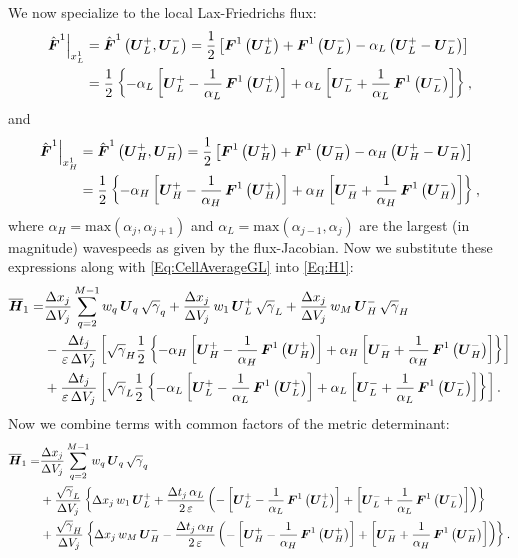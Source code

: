  We now specialize to the local Lax-Friedrichs flux:
\begin{align}
    \hat{\boldsymbol{F}}^{1}\Big|_{x^{1}_{L}}&=\hat{\boldsymbol{F}}^{1}\left(\boldsymbol{U}^{+}_{L},\boldsymbol{U}^{-}_{L}\right)=\frac{1}{2}\left[\boldsymbol{F}^{1}\left(\boldsymbol{U}^{+}_{L}\right)+\boldsymbol{F}^{1}\left(\boldsymbol{U}^{-}_{L}\right)-\alpha_{L}\left(\boldsymbol{U}_{L}^{+}-\boldsymbol{U}_{L}^{-}\right)\right]\\
    &=\frac{1}{2}\left\{-\alpha_{L}\left[\boldsymbol{U}^{+}_{L}-\frac{1}{\alpha_{L}}\,\boldsymbol{F}^{1}\left(\boldsymbol{U}^{+}_{L}\right)\right]+\alpha_{L}\left[\boldsymbol{U}^{-}_{L}+\frac{1}{\alpha_{L}}\,\boldsymbol{F}^{1}\left(\boldsymbol{U}^{-}_{L}\right)\right]\right\},
\end{align}
and
\begin{align}
    \hat{\boldsymbol{F}}^{1}\Big|_{x^{1}_{H}}&=\hat{\boldsymbol{F}}^{1}\left(\boldsymbol{U}^{+}_{H},\boldsymbol{U}^{-}_{H}\right)=\frac{1}{2}\left[\boldsymbol{F}^{1}\left(\boldsymbol{U}^{+}_{H}\right)+\boldsymbol{F}^{1}\left(\boldsymbol{U}^{-}_{H}\right)-\alpha_{H}\left(\boldsymbol{U}_{H}^{+}-\boldsymbol{U}_{H}^{-}\right)\right]\\
    &=\frac{1}{2}\left\{-\alpha_{H}\left[\boldsymbol{U}^{+}_{H}-\frac{1}{\alpha_{H}}\,\boldsymbol{F}^{1}\left(\boldsymbol{U}^{+}_{H}\right)\right]+\alpha_{H}\left[\boldsymbol{U}^{-}_{H}+\frac{1}{\alpha_{H}}\,\boldsymbol{F}^{1}\left(\boldsymbol{U}^{-}_{H}\right)\right]\right\},
\end{align}
where $\alpha_{H}=\text{max}\left(\alpha_{j},\alpha_{j+1}\right)$ and $\alpha_{L}=\text{max}\left(\alpha_{j-1},\alpha_{j}\right)$ are the largest (in magnitude) wavespeeds as given by the flux-Jacobian.
Now we substitute these expressions along with \eqref{Eq:CellAverageGL} into \eqref{Eq:H1}:
\begin{align}
    \overline{\boldsymbol{H}}_{1}=&\frac{\Delta x_{j}}{\Delta V_{j}}\sum\limits_{q=2}^{M-1}w_{q}\,\boldsymbol{U}_{q}\,\sqrt{\gamma}_{q}+\frac{\Delta x_{j}}{\Delta V_{j}}\,w_{1}\,\boldsymbol{U}^{+}_{L}\,\sqrt{\gamma}_{L}+\frac{\Delta x_{j}}{\Delta V_{j}}\,w_{M}\,\boldsymbol{U}^{-}_{H}\,\sqrt{\gamma}_{H}\\
    &-\frac{\Delta t_{j}}{\varepsilon\,\Delta V_{j}}\left[\sqrt{\gamma}_{H}\frac{1}{2}\left\{-\alpha_{H}\left[\boldsymbol{U}^{+}_{H}-\frac{1}{\alpha_{H}}\,\boldsymbol{F}^{1}\left(\boldsymbol{U}^{+}_{H}\right)\right]+\alpha_{H}\left[\boldsymbol{U}^{-}_{H}+\frac{1}{\alpha_{H}}\,\boldsymbol{F}^{1}\left(\boldsymbol{U}^{-}_{H}\right)\right]\right\}\right]\\
    &+\frac{\Delta t_{j}}{\varepsilon\,\Delta V_{j}}\left[\sqrt{\gamma}_{L}\frac{1}{2}\left\{-\alpha_{L}\left[\boldsymbol{U}^{+}_{L}-\frac{1}{\alpha_{L}}\,\boldsymbol{F}^{1}\left(\boldsymbol{U}^{+}_{L}\right)\right]+\alpha_{L}\left[\boldsymbol{U}^{-}_{L}+\frac{1}{\alpha_{L}}\,\boldsymbol{F}^{1}\left(\boldsymbol{U}^{-}_{L}\right)\right]\right\}\right].
\end{align}
Now we combine terms with common factors of the metric determinant:
\begin{align}
    \overline{\boldsymbol{H}}_{1}=&\frac{\Delta x_{j}}{\Delta V_{j}}\sum\limits_{q=2}^{M-1}w_{q}\,\boldsymbol{U}_{q}\,\sqrt{\gamma}_{q}\\
    &+\frac{\sqrt{\gamma}_{L}}{\Delta V_{j}}\left\{\Delta x_{j}\,w_{1}\,\boldsymbol{U}^{+}_{L}+\frac{\Delta t_{j}\,\alpha_{L}}{2\,\varepsilon}\left(-\left[\boldsymbol{U}^{+}_{L}-\frac{1}{\alpha_{L}}\,\boldsymbol{F}^{1}\left(\boldsymbol{U}^{+}_{L}\right)\right]+\left[\boldsymbol{U}^{-}_{L}+\frac{1}{\alpha_{L}}\,\boldsymbol{F}^{1}\left(\boldsymbol{U}^{-}_{L}\right)\right]\right)\right\}\\
    &+\frac{\sqrt{\gamma}_{H}}{\Delta V_{j}}\left\{\Delta x_{j}\,w_{M}\,\boldsymbol{U}^{-}_{H}-\frac{\Delta t_{j}\,\alpha_{H}}{2\,\varepsilon}\left(-\left[\boldsymbol{U}^{+}_{H}-\frac{1}{\alpha_{H}}\,\boldsymbol{F}^{1}\left(\boldsymbol{U}^{+}_{H}\right)\right]+\left[\boldsymbol{U}^{-}_{H}+\frac{1}{\alpha_{H}}\,\boldsymbol{F}^{1}\left(\boldsymbol{U}^{-}_{H}\right)\right]\right)\right\}.
\end{align}
